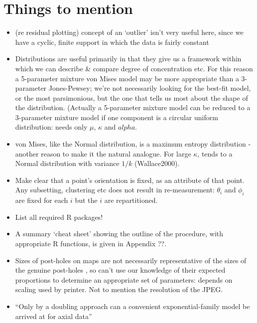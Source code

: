 \documentclass[10pt,fleqn]{article}
\numberwithin{equation}{section}
\begin{document}
\section*{Things to mention}
\begin{itemize}

\item
(re residual plotting) concept of an `outlier' isn't very useful here, since we have a cyclic, finite support in which the data is fairly constant
 
\item
Distributions are useful primarily in that they give us a framework within which we can  describe \& compare degree of concentration etc. For this reason a 5-parameter mixture von Mises model may be more appropriate than a 3-parameter Jones-Pewsey; we're not necessarily looking for the best-fit model, or the most parsimonious, but the one that tells us most about the shape of the distribution. (Actually a 5-parameter mixture model can be reduced to a 3-parameter mixture model if one component is a circular uniform distribution: needs only $\mu$, $\kappa$ and $alpha$.

\item
von Mises, like the Normal distribution, is a maximum entropy distribution - another reason to make it the natural analogue. For large $\kappa$, tends to a Normal distribution with variance $1/k$ (Wallace2000).

\item
Make clear that a point's orientation is fixed, as an attribute of that point. Any subsetting, clustering etc does not result in re-measurement: $\theta_i$ and $\phi_i$ are fixed for each $i$ but the $i$ are repartitioned.

\item
List all required R packages!

\item
A summary `cheat sheet' showing the outline of the procedure, with appropriate R functions, is given in Appendix ??.

\item
Sizes of post-holes on maps are not necessarily representative of the sizes of the genuine post-holes , so can't use our knowledge of their expected proportions to determine an appropriate set of parameters: depends on scaling used by printer. Not to mention the resolution of the JPEG.

\item 
``Only by a doubling approach can a convenient exponential-family model be arrived at for axial data'' \cite{Arnold2011}


\end{itemize}
\end{document}
